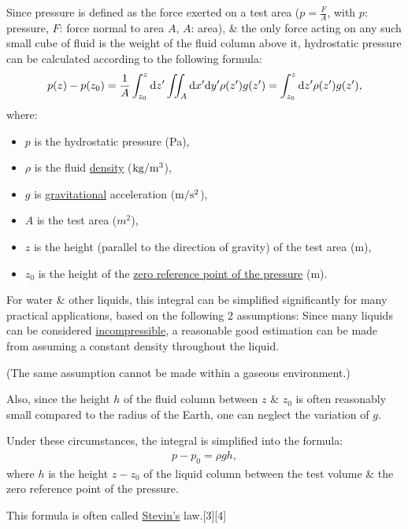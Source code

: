 \documentclass{article}
\begin{document}
Since pressure is defined as the force exerted on a test area ($p = \frac{F}{A}$, with $p$: pressure, $F$: force normal to area $A$, $A$: area), \& the only force acting on any such small cube of fluid is the weight of the fluid column above it, hydrostatic pressure can be calculated according to the following formula:
\begin{align*}
	p(z) - p(z_0) = \frac{1}{A}\int_{z_0}^z {\rm d}z'\iint_A {\rm d}x'{\rm d}y'\rho(z')g(z') = \int_{z_0}^z {\rm d}z'\rho(z')g(z'),
\end{align*}
where:
\begin{itemize}
	\item $p$ is the hydrostatic pressure (Pa),
	\item $\rho$ is the fluid \href{https://en.wikipedia.org/wiki/Density}{density} ($\rm kg/m^3$),
	\item $g$ is \href{https://en.wikipedia.org/wiki/Gravity}{gravitational} acceleration ($\rm m/s^2$),
	\item $A$ is the test area ($m^2$),
	\item $z$ is the height (parallel to the direction of gravity) of the test area (m),
	\item $z_0$ is the height of the \href{https://en.wikipedia.org/wiki/Pressure_measurement#Absolute,_gauge_and_differential_pressures_-_zero_reference}{zero reference point of the pressure} (m).
\end{itemize}
For water \& other liquids, this integral can be simplified significantly for many practical applications, based on the following 2 assumptions: Since many liquids can be considered \href{https://en.wikipedia.org/wiki/Incompressible}{incompressible}, a reasonable good estimation can be made from assuming a constant density throughout the liquid.

(The same assumption cannot be made within a gaseous environment.)

Also, since the height $h$ of the fluid column between $z$ \& $z_0$ is often reasonably small compared to the radius of the Earth, one can neglect the variation of $g$.

Under these circumstances, the integral is simplified into the formula:
\begin{align*}
	p - p_0 = \rho gh,
\end{align*}
where $h$ is the height $z - z_0$ of the liquid column between the test volume \& the zero reference point of the pressure.

This formula is often called \href{https://en.wikipedia.org/wiki/Simon_Stevin}{Stevin's} law.[3][4]
\end{document}
